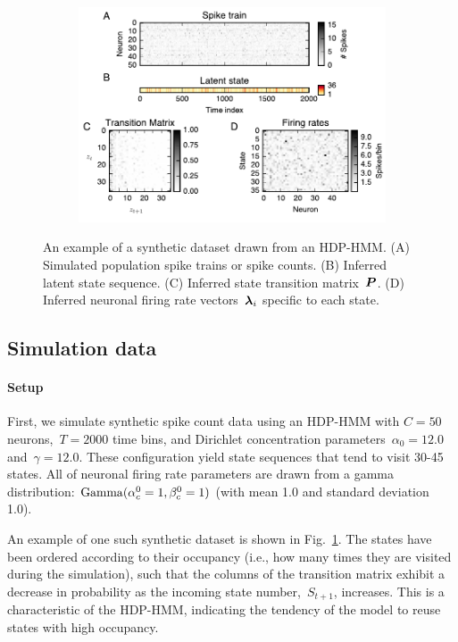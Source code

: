 \begin{figure}
\centering
\begin{subfigure}[t]{5.in}
\includegraphics[width=\textwidth]{figures/ch5/Fig1}
\end{subfigure}
\vspace{-.2in}
\caption{An example of a synthetic dataset drawn from an HDP-HMM.  (A) Simulated  population spike trains or spike counts. (B) Inferred latent state sequence. (C) Inferred state transition matrix~$\boldsymbol{P}$. (D) Inferred neuronal firing rate vectors~$\boldsymbol{\lambda}_i$ specific to each state.}
\label{fig1}
\end{figure}

 \subsection{Simulation data}

\paragraph{Setup} 
 First, we simulate synthetic spike count data using an HDP-HMM with ${C=50}$ neurons,~${T=2000}$ time bins, and Dirichlet concentration parameters~$\alpha_0=12.0$ and~$\gamma=12.0$. These configuration yield state sequences that tend to visit 30-45 states. All of neuronal firing rate parameters are drawn from a gamma distribution: $\mathrm{Gamma}(\alpha_c^0=1, \beta_c^0=1)$ (with mean 1.0 and standard deviation 1.0). 
 
 An example of one such synthetic dataset is shown in Fig.~\ref{fig1}. The states have been ordered according to their occupancy (i.e., how many times they are visited during the simulation), such that the columns of the transition matrix exhibit a decrease in probability as the incoming state number,~${S}_{t+1}$, increases. This is a characteristic of the HDP-HMM,   indicating the tendency of the model to reuse states with high occupancy.

